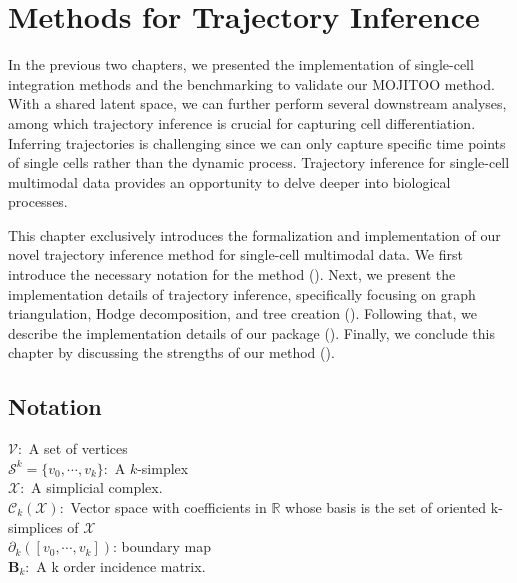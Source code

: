 %
\chapter{Methods for Trajectory Inference}
\label{chapter:methods_TI}
\graphicspath{{chapter5/figs}}

In the previous two chapters, we presented the implementation of single-cell integration methods and the benchmarking to validate our MOJITOO method. With a shared latent space, we can further perform several downstream analyses, among which trajectory inference is crucial for capturing cell differentiation. Inferring trajectories is challenging since we can only capture specific time points of single cells rather than the dynamic process. Trajectory inference for single-cell multimodal data provides an opportunity to delve deeper into biological processes.

This chapter exclusively introduces the formalization and implementation of our novel trajectory inference method for single-cell multimodal data. We first introduce the necessary notation for the method (). Next, we present the implementation details of trajectory inference, specifically focusing on graph triangulation, Hodge decomposition, and tree creation (). Following that, we describe the implementation details of our package (). Finally, we conclude this chapter by discussing the strengths of our method ().


\section{Notation} \label{TI_methods:notation}
$\mathcal{V}: $ A set of vertices\\
$\mathcal{S}^k = \{{v}_0,\cdots,{v}_k \}: $ A $k$-simplex\\
$\mathcal{X}: $ A simplicial complex.\\
$\mathcal{C}_k(\mathcal{X}): $ Vector space with coefficients in $\mathbb{R}$ whose basis is the set of oriented k-simplices of $\mathcal{X}$\\
$\partial_k ([v_0,\cdots, v_k])$: boundary map\\
$\mathbf{B}_k: $ A k order incidence matrix.\\

